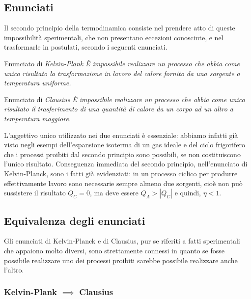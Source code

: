 \documentclass[class=book, crop=false, oneside, 12pt]{standalone}
\begin{document}
\subsection{Enunciati}

Il secondo principio della termodinamica consiste nel prendere atto di queste impossibilità sperimentali, che non presentano eccezioni conosciute, e  nel trasformarle in postulati, secondo i seguenti enunciati. 

Enunciato di \emph{Kelvin-Plank}\newline
\emph{È impossibile realizzare un processo che abbia come unico risultato la trasformazione in lavoro del calore fornito da una sorgente a temperatura uniforme.}

Enunciato di \emph{Clausius}\newline
\emph{È impossibile realizzare un processo che abbia come unico risultato il trasferimento di una quantità di calore da un corpo ad un altro a temperatura maggiore. }

L'aggettivo unico utilizzato nei due enunciati è essenziale: abbiamo infatti già visto negli esempi dell'espansione isoterma di un gas ideale e del ciclo frigorifero che i processi proibiti dal secondo principio sono possibili, se non costituiscono l'unico risultato. 
Conseguenza immediata del secondo principio, nell'enunciato di Kelvin-Planck, sono i fatti già evidenziati: in un processo ciclico per produrre effettivamente lavoro sono necessarie sempre almeno due sorgenti, cioè non può sussistere il risultato \(Q_C = 0\), ma deve essere \(Q_A > |Q_C|\) e quindi, \(\eta < 1\).

\subsection{Equivalenza degli enunciati}

Gli enunciati di Kelvin-Planck e di Clausius, pur se riferiti a fatti sperimentali che appaiono molto diversi, sono strettamente connessi in quanto se fosse possibile realizzare uno dei processi proibiti sarebbe possibile realizzare anche l'altro.

\subsubsection*{Kelvin-Plank \(\implies\) Clausius}
\end{document}
